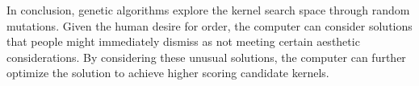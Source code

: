 \documentclass[3p,times,procedia]{elsarticle}
\begin{document}
In conclusion, genetic algorithms explore the kernel search space through random mutations. Given the human desire for order, the computer can consider solutions that people might immediately dismiss as not meeting certain aesthetic considerations. By considering these unusual solutions, the computer can further optimize the solution to achieve higher scoring candidate kernels. 








\end{document}
